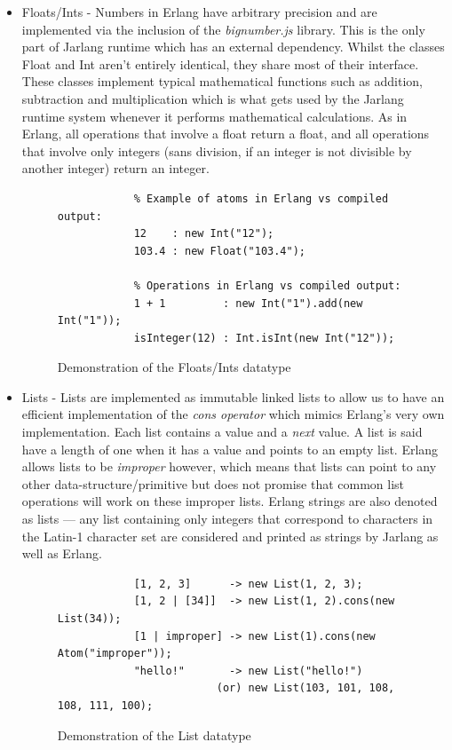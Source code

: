 \documentclass[twoside,12pt,titlepage,a4paper]{article}
\begin{document}
\begin{itemize}
	\item Floats/Ints - Numbers in Erlang have arbitrary precision and are implemented via the inclusion of the \textit{bignumber.js} library. This is the only part of Jarlang runtime which has an external dependency. Whilst the classes Float and Int aren't entirely identical, they share most of their interface. These classes implement typical mathematical functions such as addition, subtraction and multiplication which is what gets used by the Jarlang runtime system whenever it performs mathematical calculations. As in Erlang, all operations that involve a float return a float, and all operations that involve only integers (sans division, if an integer is not divisible by another integer) return an integer.
	\begin{figure}[H]
	\begin{verbatim}
	        % Example of atoms in Erlang vs compiled output:
	        12    : new Int("12");
	        103.4 : new Float("103.4");

	        % Operations in Erlang vs compiled output:
	        1 + 1         : new Int("1").add(new Int("1"));
	        isInteger(12) : Int.isInt(new Int("12"));
	\end{verbatim}
	\caption{Demonstration of the Floats/Ints datatype}
	\end{figure}

	\item Lists - Lists are implemented as immutable linked lists to allow us to have an efficient implementation of the \textit{cons operator} which mimics Erlang's very own implementation. Each list contains a value and a \textit{next} value. A list is said have a length of one when it has a value and points to an empty list. Erlang allows lists to be \textit{improper} however, which means that lists can point to any other data-structure/primitive but does not promise that common list operations will work on these improper lists. Erlang strings are also denoted as lists --- any list containing only integers that correspond to characters in the Latin-1 character set are considered and printed as strings by Jarlang as well as Erlang.
	\begin{figure}[H]
	\begin{verbatim}
	        [1, 2, 3]      -> new List(1, 2, 3);
	        [1, 2 | [34]]  -> new List(1, 2).cons(new List(34));
	        [1 | improper] -> new List(1).cons(new Atom("improper"));
	        "hello!"       -> new List("hello!")
	                     (or) new List(103, 101, 108, 108, 111, 100);
	\end{verbatim}
	\caption{Demonstration of the List datatype}
	\end{figure}


\end{itemize}
\end{document}
